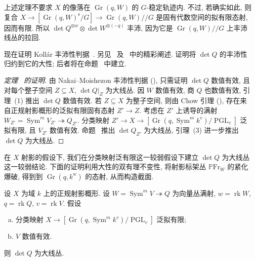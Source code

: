 \begin{remark}[稳定性]\label{src:6.9.14}
上述定理不要求 $X$ 的像落在 $\operatorname{Gr}(q,\allowbreak W)$ 的 $G$-稳定轨迹内. 不过, 若确实如此, 则复合 $X\to[\operatorname{Gr}(q,\allowbreak W)^{\mathrm s}/G]\to\operatorname{Gr}(q,\allowbreak W)\mathbin{/\!/}G$ 是固有代数空间的拟有限态射, 因而有限. 所以 $\det Q^{\otimes w}\otimes\det W^{\otimes(-q)}$ 丰沛, 因为它是 $\operatorname{Gr}(q,\allowbreak W)\mathbin{/\!/}G$ 上丰沛线丛的拉回.
\end{remark}
现在证明 Kollár 丰沛性判据~\cite[引理 3.9]{Kol90}. 另见~\cite[定理 5.1]{KP17} 及~\cite{CLM22} 中的精彩阐述. 证明将 $\det Q$ 的丰沛性归约到它的大性; 后者将在命题~ 中建立.
\begin{proof}[定理~ 的证明]
由 Nakai--Moishezon 丰沛性判据 (), 只需证明 $\det Q$ 数值有效, 且对每个整子空间 $Z\subseteq X$, $\det Q|_Z$ 为大线丛. 因 $W$ 数值有效, 商 $Q$ 也数值有效, 引理~(1) 推出 $\det Q$ 数值有效. 若 $Z\subseteq X$ 为整子空间, 则由 Chow 引理 (), 存在来自正规射影概形的泛拟有限固有态射 $Z'\to\allowbreak Z$. 考虑在 $Z'$ 上诱导的满射 $W_{Z'}=\operatorname{Sym}^mV_{Z'}\twoheadrightarrow Q_{Z'}$. 分类映射 $Z'\to\allowbreak X\to[\operatorname{Gr}(q,\allowbreak \operatorname{Sym}^mk^v)/\operatorname{PGL}_v]$ 泛拟有限, 且 $V_{Z'}$ 数值有效. 命题~ 推出 $\det Q_{Z'}$ 为大线丛, 引理~(3) 进一步推出 $\det Q$ 为大线丛.
\end{proof}
在 $X$ 射影的假设下, 我们在分类映射泛有限这一较弱假设下建立 $\det Q$ 为大线丛这一较弱结论. 下面的证明利用大性的双有理不变性, 将射影标架丛 $\mathbb P\mathrm{Fr}_W$ 的紧化爆破, 得到到 $\operatorname{Gr}(q,\allowbreak k^w)$ 的态射, 从而构造截面.
\newpage
\begin{proposition}\label{src:6.9.15}
设 $X$ 为域 $k$ 上的正规射影概形. 设 $W=\operatorname{Sym}^mV\twoheadrightarrow Q$ 为向量丛满射, $w=\operatorname{rk}W$, $q=\operatorname{rk}Q$, $v=\operatorname{rk}V$. 假设
\begin{enumerate}[(a)]
\item 分类映射 $X\to[\operatorname{Gr}(q,\allowbreak \operatorname{Sym}^mk^v)/\operatorname{PGL}_v]$ 泛拟有限;
\item $V$ 数值有效.
\end{enumerate}
则 $\det Q$ 为大线丛.
\end{proposition}
